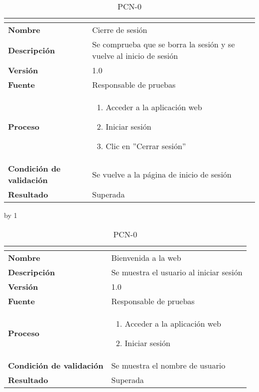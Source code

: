 \begin{table}[H]
	\caption{PCN-0\number\pcn}
	\begin{tabular}{|l|p{}|}
		\hline
		\multicolumn{2}{|c|}{\cellcolor[HTML]{BFBFBF}{\color[HTML]{000000} \textbf{PCN-0\number\pcn}}} \\ \hline
		\textbf{Nombre}                  & Cierre de sesión                                                    \\ \hline
		\textbf{Descripción}             & Se comprueba que se borra la sesión y se vuelve al inicio de sesión \\ \hline
		\textbf{Versión}                 & 1.0                                                                 \\ \hline
		\textbf{Fuente}                  & Responsable de pruebas                                              \\ \hline
		\textbf{Proceso}                 & \begin{enumerate}
			\item Acceder a la aplicación web
			\item Iniciar sesión
			\item Clic en ''Cerrar sesión''
		\end{enumerate}                                          \\ \hline
		\textbf{Condición de validación} & Se vuelve a la página de inicio de sesión                           \\ \hline
		\textbf{Resultado}               & Superada                                                            \\ \hline
	\end{tabular}
\end{table}
\advance\pcn by 1
\begin{table}[H]
	\caption{PCN-0\number\pcn}
	\begin{tabular}{|l|p{}|}
		\hline
		\multicolumn{2}{|c|}{\cellcolor[HTML]{BFBFBF}{\color[HTML]{000000} \textbf{PCN-0\number\pcn}}} \\ \hline
		\textbf{Nombre}                  & Bienvenida a la web                     \\ \hline
		\textbf{Descripción}             & Se muestra el usuario al iniciar sesión \\ \hline
		\textbf{Versión}                 & 1.0                                     \\ \hline
		\textbf{Fuente}                  & Responsable de pruebas                  \\ \hline
		\textbf{Proceso}                 & \begin{enumerate}
			\item Acceder a la aplicación web
			\item Iniciar sesión
		\end{enumerate}              \\ \hline
		\textbf{Condición de validación} & Se muestra el nombre de usuario         \\ \hline
		\textbf{Resultado}               & Superada                                \\ \hline
	\end{tabular}
\end{table}
